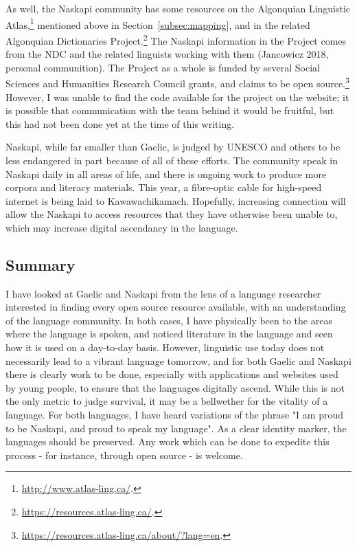 As well, the Naskapi community has some resources on the Algonquian Linguistic Atlas,\footnote{\href{http://www.atlas-ling.ca/}{http://www.atlas-ling.ca/}. } mentioned above in Section~\ref{subsec:mapping}, and in the related Algonquian Dictionaries Project.\footnote{\href{https://resources.atlas-ling.ca/}{https://resources.atlas-ling.ca/}. } The Naskapi information in the Project comes from the NDC and the related linguists working with them (Jancowicz 2018, personal communition). The Project as a whole is funded by several Social Sciences and Humanities Research Council grants, and claims to be open source.\footnote{\href{https://resources.atlas-ling.ca/about/?lang=en}{https://resources.atlas-ling.ca/about/?lang=en}. } However, I was unable to find the code available for the project on the website; it is possible that communication with the team behind it would be fruitful, but this had not been done yet at the time of this writing.

Naskapi, while far smaller than Gaelic, is judged by UNESCO and others to be less endangered in part because of all of these efforts. The community speak in Naskapi daily in all areas of life, and there is ongoing work to produce more corpora and literacy materials. This year, a fibre-optic cable for high-speed internet is being laid to Kawawachikamach. Hopefully, increasing connection will allow the Naskapi to access resources that they have otherwise been unable to, which may increase digital ascendancy in the language. 

\subsection{Summary}

I have looked at Gaelic and Naskapi from the lens of a language researcher interested in finding every open source resource available, with an understanding of the language community. In both cases, I have physically been to the areas where the language is spoken, and noticed literature in the language and seen how it is used on a day-to-day basis. However, linguistic use today does not necessarily lead to a vibrant language tomorrow, and for both Gaelic and Naskapi there is clearly work to be done, especially with applications and websites used by young people, to ensure that the languages digitally ascend. While this is not the only metric to judge survival, it may be a bellwether for the vitality of a language. For both languages, I have heard variations of the phrase "I am proud to be Naskapi, and proud to speak my language". As a clear identity marker, the languages should be preserved. Any work which can be done to expedite this process - for instance, through open source - is welcome. 
